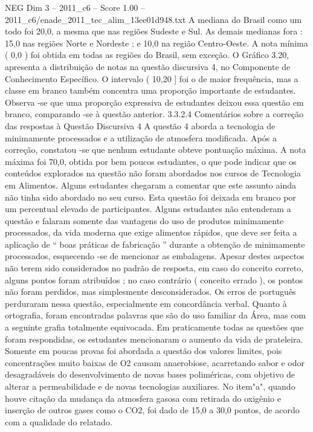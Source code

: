 \begin{textsample}{NEG Dim 3 – 2011\_c6 – Score 1.00 – 2011\_c6/enade\_2011\_tec\_alim\_13ee01d948.txt}
A mediana do Brasil como um todo foi 20,0, a mesma que nas regiões Sudeste e Sul.
As demais medianas fora : 15,0 nas regiões Norte e Nordeste ; e 10,0 na região Centro-Oeste.
A nota mínima ( 0,0 ) foi obtida em todas as regiões do Brasil, sem exceção.
O Gráfico 3.20, apresenta a distribuição de notas na questão discursiva 4, no Componente de Conhecimento Específico.
O intervalo ( 10,20 ] foi o de maior frequência, mas a classe em branco também concentra uma proporção importante de estudantes.
Observa -se que uma proporção expressiva de estudantes deixou essa questão em branco, comparando -se à questão anterior. 3.3.2.4 Comentários sobre a correção das respostas à Questão Discursiva 4 A questão 4 aborda a tecnologia de minimamente processados e a utilização de atmosfera modificada.
Após a correção, constatou -se que nenhum estudante obteve pontuação máxima.
A nota máxima foi 70,0, obtida por bem poucos estudantes, o que pode indicar que os conteúdos explorados na questão não foram abordados nos cursos de Tecnologia em Alimentos.
Alguns estudantes chegaram a comentar que este assunto ainda não tinha sido abordado no seu curso.
Esta questão foi deixada em branco por um percentual elevado de participantes.
Alguns estudantes não entenderam a questão e falaram somente das vantagens do uso de produtos minimamente processados, da vida moderna que exige alimentos rápidos, que deve ser feita a aplicação de “ boas práticas de fabricação ” durante a obtenção de minimamente processados, esquecendo -se de mencionar as embalagens.
Apesar destes aspectos não terem sido considerados no padrão de resposta, em caso do conceito correto, alguns pontos foram atribuídos ; no caso contrário ( conceito errado ), os pontos não foram perdidos, mas simplesmente desconsiderados.
Os erros de português perduraram nessa questão, especialmente em concordância verbal.
Quanto à ortografia, foram encontradas palavras que são do uso familiar da Área, mas com a seguinte grafia totalmente equivocada.
Em praticamente todas as questões que foram respondidas, os estudantes mencionaram o aumento da vida de prateleira.
Somente em poucas provas foi abordada a questão dos valores limites, pois concentrações muito baixas de O2 causam anaerobiose, acarretando sabor e odor desagradáveis do desenvolvimento de novas bases poliméricas, com objetivo de alterar a permeabilidade e de novas tecnologias auxiliares.
No item"a", quando houve citação da mudança da atmosfera gasosa com retirada do oxigênio e inserção de outros gases como o CO2, foi dado de 15,0 a 30,0 pontos, de acordo com a qualidade do relatado.

\end{textsample}
